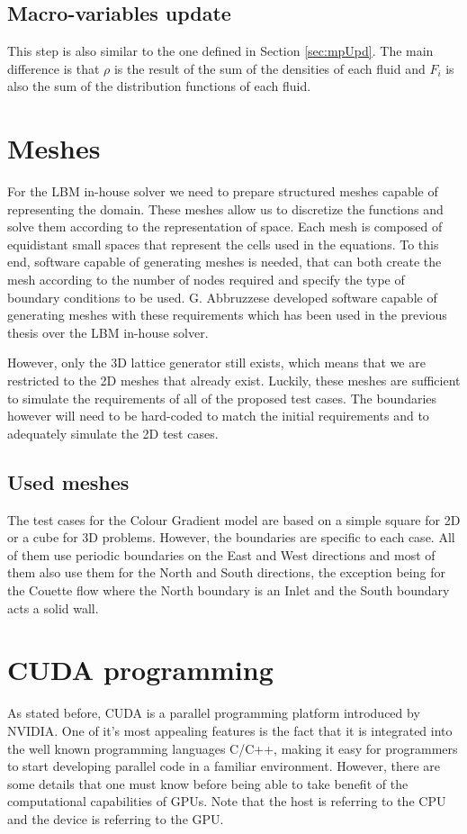 \documentclass[12pt, openany]{book}
\begin{document}
\subsection{Macro-variables update}
This step is also similar to the one defined in Section \ref{sec:mpUpd}. The main difference is that $\rho$ is the result of the sum of the densities of each fluid and $F_i$ is also the sum of the distribution functions of each fluid. 
\section{Meshes}
For the LBM in-house solver we need to prepare structured meshes capable of representing the domain. These meshes allow us to discretize the functions and solve them according to the representation of space. Each mesh is composed of equidistant small spaces that represent the cells used in the equations. To this end, software capable of generating meshes is needed, that can both create the mesh according to the number of nodes required and specify the type of boundary conditions to be used. G. Abbruzzese developed software capable of generating meshes with these requirements \cite{abbru} which has been used in the previous thesis over the LBM in-house solver. \par
However, only the 3D lattice generator still exists, which means that we are restricted to the 2D meshes that already exist. Luckily, these meshes are sufficient to simulate the requirements of all of the proposed test cases. The boundaries however will need to be hard-coded to match the initial requirements and to adequately simulate the 2D test cases.
\subsection{Used meshes}
The test cases for the Colour Gradient model are based on a simple square for 2D or a cube for 3D problems. However, the boundaries are specific to each case. All of them use periodic boundaries on the East and West directions and most of them also use them for the North and South directions, the exception being for the Couette flow where the North boundary is an Inlet and the South boundary acts a solid wall.
\section{CUDA programming}
As stated before, CUDA is a parallel programming platform introduced by NVIDIA. One of it's most appealing features is the fact that it is integrated into the well known programming languages C/C++, making it easy for programmers to start developing parallel code in a familiar environment. However, there are some details that one must know before being able to take benefit of the computational capabilities of GPUs. Note that the host is referring to the CPU and the device is referring to the GPU.
\end{document}
